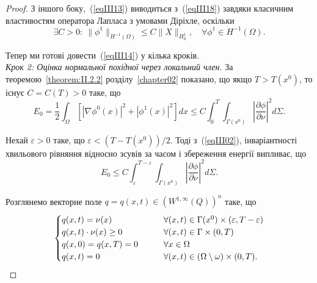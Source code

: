 \begin{proof}
З іншого боку,~(\ref{eqIII13}) виводиться з~(\ref{eqIII18}) завдяки класичним властивостям оператора Лапласа з умовами Діріхле, оскільки
\begin{equation}\label{eqIII19}
    \exists C > 0:\ \|\phi^1\|_{H^{-1}(\Omega)} \leq C \|X\|_{H^1_0}, \quad \forall \phi^1 \in H^{-1}(\Omega).
\end{equation}

Тепер ми готові довести~(\ref{eqIII14}) у кілька кроків.\\
\label{sec:III.2-c}
\emph{Крок 2: Оцінка нормальної похідної через локальний член.}
За теоремою~\ref{theorem:II.2.2} розділу~\ref{chapter02} показано, що якщо $T>T(x^0)$, то існує $C=C(T)>0$ таке, що
\begin{equation}\label{eqIII20}
    E_0 = \frac{1}{2} \int_\Omega \left[\left|\nabla \phi^0(x)\right|^2 + \left|\phi^1(x)\right|^2\right] dx \leq
    C \int^T_0 \int_{\Gamma(x^0)} \left|\frac{\partial \phi}{\partial \nu}\right|^2 d\Sigma.
\end{equation}

Нехай $\varepsilon > 0$ таке, що $\varepsilon < (T - T(x^0))/2$. Тоді з~(\ref{eqIII02}), інваріантності хвильового рівняння відносно зсувів за часом і збереження енергії випливає, що
\begin{equation}\label{eqIII21}
    E_0 \leq C \int^{T-\varepsilon}_\varepsilon \int_{\Gamma(x^0)} \left|\frac{\partial \phi}{\partial \nu}\right|^2 d\Sigma.
\end{equation}

Розглянемо векторне поле $q = q(x,t) \in (W^{1,\infty}(Q))^n$ таке, що
\begin{equation}\label{eqIII22}
\begin{cases}
q(x,t) = \nu(x) & \hspace{0.7cm} \forall(x,t) \in \Gamma(x^0) \times (\varepsilon, T-\varepsilon)
\\
q(x,t)\cdot \nu(x) \geq 0 & \hspace{0.7cm} \forall(x,t) \in \Gamma \times (0,T)
\\
q(x,0) = q(x,T) = 0 & \hspace{0.7cm} \forall x \in \Omega
\\
q(x,t) = 0 & \hspace{0.7cm} \forall(x,t) \in (\Omega \setminus \omega) \times (0,T).
\end{cases}
\end{equation}


\end{proof}

